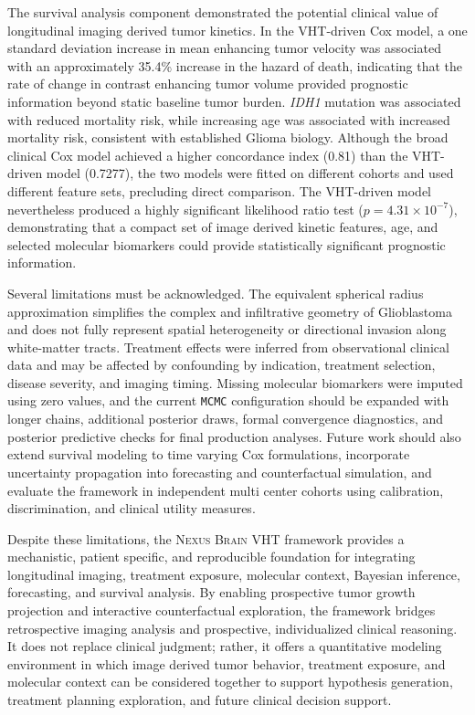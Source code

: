 The survival analysis component demonstrated the potential clinical value of longitudinal imaging derived tumor kinetics. In the VHT-driven Cox model, a one standard deviation increase in mean enhancing tumor velocity was associated with an approximately 35.4\% increase in the hazard of death, indicating that the rate of change in contrast enhancing tumor volume provided prognostic information beyond static baseline tumor burden. \textit{IDH1} mutation was associated with reduced mortality risk, while increasing age was associated with increased mortality risk, consistent with established Glioma biology. Although the broad clinical Cox model achieved a higher concordance index (0.81) than the VHT-driven model (0.7277), the two models were fitted on different cohorts and used different feature sets, precluding direct comparison. The VHT-driven model nevertheless produced a highly significant likelihood ratio test ($p=4.31\times10^{-7}$), demonstrating that a compact set of image derived kinetic features, age, and selected molecular biomarkers could provide statistically significant prognostic information.

Several limitations must be acknowledged. The equivalent spherical radius approximation simplifies the complex and infiltrative geometry of Glioblastoma and does not fully represent spatial heterogeneity or directional invasion along white-matter tracts. Treatment effects were inferred from observational clinical data and may be affected by confounding by indication, treatment selection, disease severity, and imaging timing. Missing molecular biomarkers were imputed using zero values, and the current \texttt{MCMC} configuration should be expanded with longer chains, additional posterior draws, formal convergence diagnostics, and posterior predictive checks for final production analyses. Future work should also extend survival modeling to time varying Cox formulations, incorporate uncertainty propagation into forecasting and counterfactual simulation, and evaluate the framework in independent multi center cohorts using calibration, discrimination, and clinical utility measures.

Despite these limitations, the \textsc{Nexus Brain} VHT framework provides a mechanistic, patient specific, and reproducible foundation for integrating longitudinal imaging, treatment exposure, molecular context, Bayesian inference, forecasting, and survival analysis. By enabling prospective tumor growth projection and interactive counterfactual exploration, the framework bridges retrospective imaging analysis and prospective, individualized clinical reasoning. It does not replace clinical judgment; rather, it offers a quantitative modeling environment in which image derived tumor behavior, treatment exposure, and molecular context can be considered together to support hypothesis generation, treatment planning exploration, and future clinical decision support.